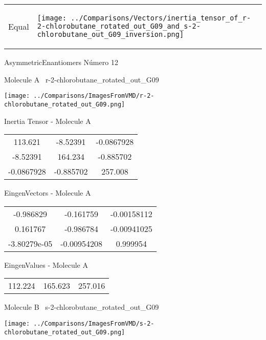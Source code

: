 \vtab[-5mm]
\begin{tabular}{*{2}{m{}}}
\begin{center}
\textcolor{NavyBlue}{\Large Equal}
\end{center}
&
\begin{center}
\texttt{[image: ../Comparisons/Vectors/inertia\_tensor\_of\_r-2-chlorobutane\_rotated\_out\_G09\_and\_s-2-chlorobutane\_out\_G09\_inversion.png]}
\end{center}
\end{tabular}

 \newpage

\vtab[-3cm]
\begin{center}
{\large AsymmetricEnantiomers \tab Número 12}
\end{center}
\begin{multicols}{2}
\begin{center}

Molecule A \
r-2-chlorobutane\_rotated\_out\_G09

\texttt{[image: ../Comparisons/ImagesFromVMD/r-2-chlorobutane\_rotated\_out\_G09.png]}

Inertia Tensor - Molecule A \\
\begin{tabular}{|c c c|}
113.621	 & 	-8.52391	 & 	-0.0867928	 \\
-8.52391	 & 	164.234	 & 	-0.885702	 \\
-0.0867928	 & 	-0.885702	 & 	257.008
\end{tabular}

\vtab
 EingenVectors - Molecule A     \\
\begin{tabular}{|c c c|}
-0.986829	 & 	-0.161759	 & 	-0.00158112	 \\
0.161767	 & 	-0.986784	 & 	-0.00941025	 \\
-3.80279e-05	 & 	-0.00954208	 & 	0.999954
\end{tabular}

\vtab
 EingenValues - Molecule A     \\
\begin{tabular}{|c c c|}
112.224	 & 	165.623	 & 	257.016	 \\
\end{tabular}
\columnbreak

Molecule B \
s-2-chlorobutane\_rotated\_out\_G09

\texttt{[image: ../Comparisons/ImagesFromVMD/s-2-chlorobutane\_rotated\_out\_G09.png]}


\end{center}
\end{multicols}
